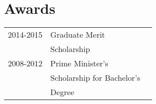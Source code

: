 \documentclass[letterpaper]{deedy-resume} %
\begin{document}
\begin{minipage}[t]{0.33\textwidth}
\sectionspace %
\section{Awards} 

\begin{tabular}{rll}
2014-2015& Graduate Merit \\ &Scholarship\\
2008-2012& Prime Minister's \\ 
&Scholarship for Bachelor's \\ &Degree 
\end{tabular}





\end{minipage} %
\hfill
%
%
\end{document}
